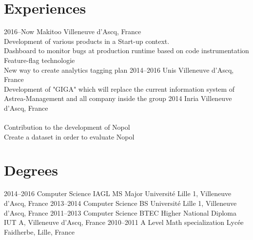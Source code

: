 \documentclass[hidelinks]{cv-style}          %
\begin{document}
\section{Experiences}
\begin{entrylist}
\entry
  {2016--Now}
  {Makitoo}
  {Villeneuve d'Ascq, France}
  {\\
  Development of various products in a Start-up context.\\
  Dashboard to monitor bugs at production runtime based on code instrumentation\\
  Feature-flag technologie\\
  New way to create analytics tagging plan
}
\entry
  {2014--2016}
  {Unis}
  {Villeneuve d'Ascq, France}
  {\\
  Development of "GIGA" which will replace the current information system of Astrea-Management and all company inside the group
}
\entry
  {2014}
  {Inria}
  {Villeneuve d'Ascq, France}
  {\\
  \\
  Contribution to the development of Nopol\\
  Create a dataset in order to evaluate Nopol
}


\end{entrylist}
\leavevmode\newline



\section{Degrees}
\begin{entrylist}

\entry
{2014--2016}
{Computer Science IAGL MS {\normalfont Major}}
{Université Lille 1, Villeneuve d'Ascq, France}
{\vspace{-0.3cm}}
\entry
{2013--2014}
{Computer Science BS}
{Université Lille 1, Villeneuve d'Ascq, France}
{\vspace{-0.3cm}}
\entry
{2011--2013}
{Computer Science BTEC Higher National Diploma}
{IUT A, Villeneuve d'Ascq, France}
{\vspace{-0.3cm}}
\entry
{2010--2011}
{A Level {\normalfont Math specialization}}
{Lycée Faidherbe, Lille, France}
{\vspace{-0.3cm}}

\end{entrylist}
\leavevmode\newline
\end{document}
